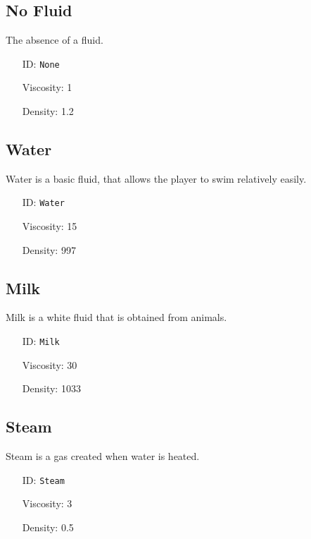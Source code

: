 \subsection{No Fluid}\label{subsec:fluids_no fluid}
The absence of a fluid.
\newline
\begin{itemize}[nosep]
\item[ID:] \texttt{None}
\item[Viscosity:] 1
\item[Density:] 1.2
\end{itemize}

\subsection{Water}\label{subsec:fluids_water}
Water is a basic fluid, that allows the player to swim relatively easily.
\newline
\begin{itemize}[nosep]
    \item[ID:] \texttt{Water}
    \item[Viscosity:] 15
    \item[Density:] 997
\end{itemize}

\subsection{Milk}\label{subsec:fluids_milk}
Milk is a white fluid that is obtained from animals.
\newline
\begin{itemize}[nosep]
    \item[ID:] \texttt{Milk}
    \item[Viscosity:] 30
    \item[Density:] 1033
\end{itemize}

\subsection{Steam}\label{subsec:fluids_steam}
Steam is a gas created when water is heated.
\newline
\begin{itemize}[nosep]
    \item[ID:] \texttt{Steam}
    \item[Viscosity:] 3
    \item[Density:] 0.5
\end{itemize}

